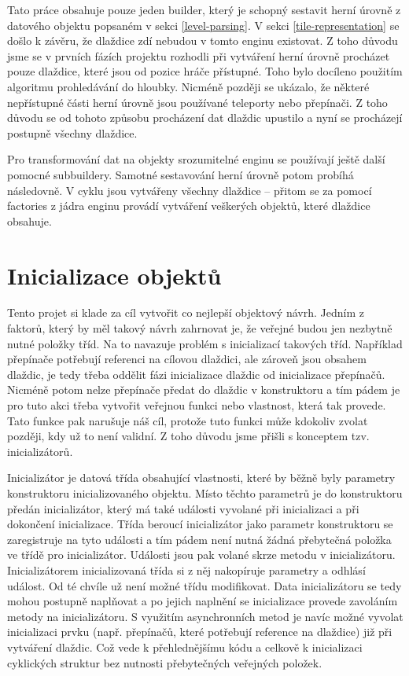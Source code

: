 Tato práce obsahuje pouze jeden builder, který je schopný sestavit herní úrovně z datového objektu popsaném v sekci \ref{level-parsing}.
V sekci \ref{tile-representation} se došlo k závěru, že dlaždice zdí nebudou v tomto enginu existovat. Z toho důvodu jsme se 
v prvních fázích projektu rozhodli při vytváření herní úrovně procházet pouze dlaždice, které jsou od pozice hráče přístupné.
Toho bylo docíleno použitím algoritmu prohledávání do hloubky. Nicméně později se ukázalo, že některé nepřístupné části herní úrovně
jsou používané teleporty nebo přepínači. Z toho důvodu se od tohoto způsobu procházení dat dlaždic upustilo a nyní se procházejí 
postupně všechny dlaždice.

Pro transformování dat na objekty srozumitelné enginu se používají ještě další pomocné subbuildery. 
Samotné sestavování herní úrovně potom probíhá následovně. V cyklu jsou vytvářeny všechny dlaždice -- přitom se za pomocí factories 
z jádra enginu provádí vytváření veškerých objektů, které dlaždice obsahuje.


\section{Inicializace objektů}\label{level-inicialization}

Tento projet si klade za cíl  vytvořit co nejlepší objektový návrh. Jedním z faktorů, který by měl takový návrh
zahrnovat je, že veřejné budou jen nezbytně nutné položky tříd. Na to navazuje problém s inicializací takových tříd. 
Například přepínače potřebují referenci na cílovou dlaždici, ale zároveň jsou obsahem dlaždic, je tedy třeba oddělit fázi inicializace 
dlaždic od inicializace přepínačů. Nicméně potom nelze přepínače předat do dlaždic v konstruktoru a tím pádem je pro tuto akci třeba 
vytvořit veřejnou funkci nebo vlastnost, která tak provede. Tato funkce pak narušuje náš cíl, protože tuto funkci může kdokoliv
zvolat později, kdy už to není validní. Z toho důvodu jsme přišli s konceptem tzv. inicializátorů.

Inicializátor je datová třída obsahující vlastnosti, které by běžně byly parametry konstruktoru inicializovaného objektu.
Místo těchto parametrů je do konstruktoru předán inicializátor, který má také události vyvolané
při inicializaci a při dokončení inicializace. Třída beroucí inicializátor jako parametr konstruktoru se zaregistruje na tyto události a
tím pádem není nutná žádná přebytečná položka ve třídě pro inicializátor. Události jsou pak volané skrze metodu v inicializátoru.
Inicializátorem inicializovaná třída si z něj nakopíruje parametry a odhlásí událost. Od té chvíle už není možné třídu modifikovat.
Data inicializátoru se tedy mohou postupně naplňovat a po jejich naplnění se inicializace provede zavoláním metody na inicializátoru.
S využitím asynchronních metod je navíc možné vyvolat inicializaci prvku  (např. přepínačů, které potřebují reference na dlaždice) 
již při vytváření dlaždic. Což vede k přehlednějšímu kódu a celkově k inicializaci cyklických struktur bez nutnosti přebytečných 
veřejných položek. 

